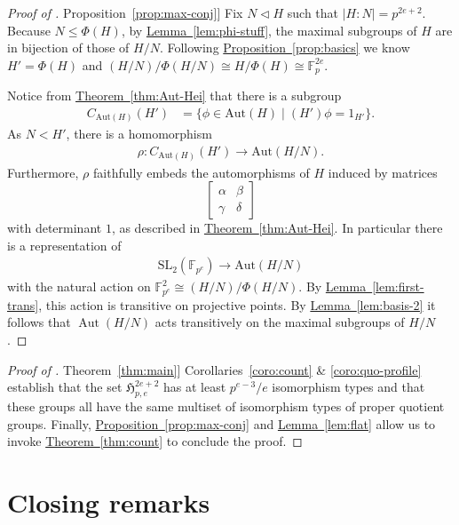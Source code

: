 \documentclass[11pt]{article}
\numberwithin{equation}{section}
\theoremstyle{definition}
\theoremstyle{plain}
\newcommand{\expref}[2]{\hyperref[#2]{#1~\ref{#2}}}
\numberwithin{equation}{section}
\theoremstyle{plain}       %
\theoremstyle{remark}
\theoremstyle{definition}
\numberwithin{figure}{section}
\numberwithin{table}{section}
\newcommand{\mygroups}{\mathfrak{H}}
\newcommand{\bbF}{\mathbb{F}}  %
\DeclareMathOperator{\Aut}{Aut}  %
\begin{document}
\begin{proof}[Proof of \expref{Proposition}{prop:max-conj}]
	Fix $N\lhd H$ such that $|H:N|=p^{2e+2}$.  Because $N\leq \Phi(H)$, by
	\expref{Lemma}{lem:phi-stuff}, the maximal subgroups of $H$ are in bijection of
	those of $H/N$.  Following \expref{Proposition}{prop:basics} we know
	$H'=\Phi(H)$ and $(H/N)/\Phi(H/N)\cong H/\Phi(H)\cong\bbF_{p}^{2e}$.  
	
	Notice from \expref{Theorem}{thm:Aut-Hei} that there is a subgroup
	\begin{align*}
		C_{\mathrm{Aut}(H)}(H') & = \{ \phi\in \mathrm{Aut}(H)
			\mid (H')\phi=1_{H'}\}.
	\end{align*}
	As $N<H'$, there is a homomorphism
	\begin{align*}
		\rho:C_{\mathrm{Aut}(H)}(H')\to \mathrm{Aut}(H/N).
	\end{align*}
Furthermore, $\rho$ faithfully embeds the automorphisms of $H$ induced by
matrices
\[
  \begin{bmatrix} \alpha & \beta \\ \gamma & \delta\end{bmatrix}
\]
with
determinant $1$, as described in \expref{Theorem}{thm:Aut-Hei}.  In particular there
is a representation of 
	\begin{align*}
		\mathrm{SL}_2(\bbF_{p^e}) \to \mathrm{Aut}(H/N)
	\end{align*}
	with the natural action on $\bbF_{p^e}^2\cong (H/N)/\Phi(H/N)$. By
	\expref{Lemma}{lem:first-trans}, this action is transitive on projective points.
	By \expref{Lemma}{lem:basis-2} it follows that $\Aut(H/N)$ acts transitively on
	the maximal subgroups of $H/N$.
\end{proof}


\begin{proof}[Proof of \expref{Theorem}{thm:main}]
Corollaries~\ref{coro:count} \& \ref{coro:quo-profile} establish that the set
$\mygroups_{p,e}^{2e+2}$  has at  least $p^{e-3}/e$ isomorphism types and that
these groups all have the same multiset of isomorphism types of proper quotient
groups.  Finally, \expref{Proposition}{prop:max-conj} and \expref{Lemma}{lem:flat} allow
us to invoke \expref{Theorem}{thm:count} to conclude the proof.
\end{proof}


\section{Closing remarks}
\end{document}
